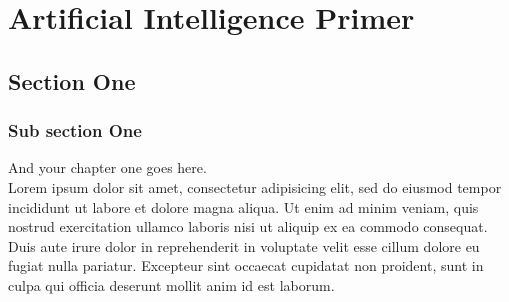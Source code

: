 \chapter{Artificial Intelligence Primer}%
\label{chap:chap2}

\section{Section One}
\label{section:chap2:sec1}

  \subsection{Sub section One}
  And your chapter one goes here\cite{web001}\@. ~\\
  Lorem ipsum dolor sit amet, consectetur adipisicing elit, sed do eiusmod
  tempor incididunt ut labore et dolore magna aliqua. Ut enim ad minim veniam,
  quis nostrud exercitation ullamco laboris nisi ut aliquip ex ea commodo
  consequat. Duis aute irure dolor in reprehenderit in voluptate velit esse
  cillum dolore eu fugiat nulla pariatur. Excepteur sint occaecat cupidatat non
  proident, sunt in culpa qui officia deserunt mollit anim id est laborum.


